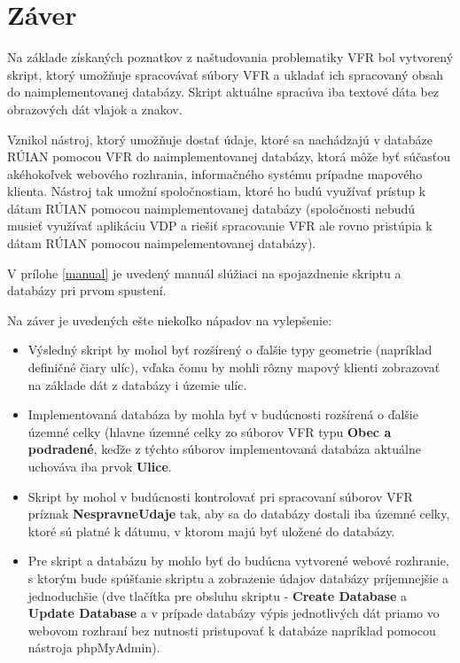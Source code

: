 \chapter{Záver}
\label{chapter5}
Na základe získaných poznatkov z naštudovania problematiky VFR bol vytvorený skript, ktorý umožňuje spracovávať súbory VFR a ukladať ich spracovaný obsah do naimplementovanej databázy. Skript aktuálne spracúva iba textové dáta bez obrazových dát vlajok a znakov.

Vznikol nástroj, ktorý umožňuje dostať údaje, ktoré sa nachádzajú v databáze RÚIAN pomocou VFR do naimplementovanej databázy, ktorá môže byť súčasťou akéhokoľvek webového rozhrania, informačného systému prípadne mapového klienta. Nástroj tak umožní spoločnostiam, ktoré ho budú využívať prístup k dátam RÚIAN pomocou naimplementovanej databázy (spoločnosti nebudú musieť využívať aplikáciu VDP a riešiť spracovanie VFR ale rovno pristúpia k dátam RÚIAN pomocou naimpelementovanej databázy).

V prílohe \ref{manual} je uvedený manuál slúžiaci  na spojazdnenie skriptu a databázy pri prvom spustení.

Na záver je uvedených ešte niekoľko nápadov na vylepšenie:
\begin{itemize}
\item{Výsledný skript by mohol byť rozšírený o ďalšie typy geometrie (napríklad definičné čiary ulíc), vďaka čomu by mohli rôzny mapový klienti zobrazovať na základe dát z databázy i územie ulíc.}

\item{Implementovaná databáza by mohla byť v budúcnosti rozšírená o ďalšie územné celky (hlavne územné celky zo súborov VFR typu {\bf Obec a podradené}, keďže z týchto súborov implementovaná databáza aktuálne uchováva iba prvok {\bf Ulice}.}

\item{Skript by mohol v budúcnosti kontrolovať pri spracovaní súborov VFR príznak {\bf NespravneUdaje} tak, aby sa do databázy dostali iba územné celky, ktoré sú platné k dátumu, v ktorom majú byť uložené do databázy.}
\item{Pre skript a databázu by mohlo byť do budúcna vytvorené webové rozhranie, s ktorým bude spúšťanie skriptu a zobrazenie údajov databázy príjemnejšie a jednoduchšie (dve tlačítka pre obsluhu skriptu - {\bf Create Database} a {\bf Update Database} a v prípade databázy výpis jednotlivých dát priamo vo webovom rozhraní bez nutnosti pristupovať k databáze napríklad pomocou nástroja phpMyAdmin).}
\end{itemize}






